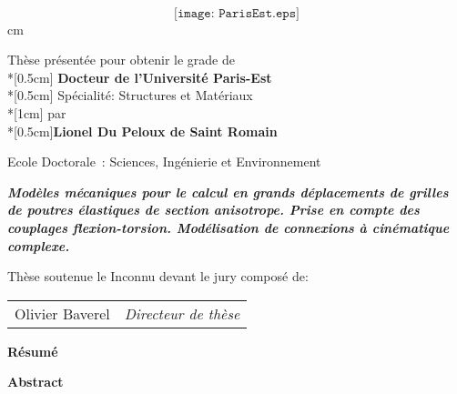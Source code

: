 \documentclass[12pt,a4paper]{book}
\begin{document}
\begin{titlepage}

\ \vspace{-2cm} { \[ \texttt{[image: ParisEst.eps]}\]}
 cm
\begin{center}
\large Thèse présentée pour obtenir le grade de\\*[0.5cm]
  {\bf \Large Docteur de l'Université Paris-Est}\\*[0.5cm]
  Spécialité: Structures et Matériaux\\*[1cm]
  par\\*[0.5cm]{\bf \Large Lionel Du Peloux de Saint Romain}\\
\end{center}\begin{center}
\begin{minipage}{15cm}
\begin{center}
Ecole Doctorale~:  \sc Sciences,  Ingénierie et Environnement
\end{center}
\end{minipage}
\end{center}
\vfill
\begin{center}
\begin{minipage}{15cm}
\begin{center}
  \LARGE \bf\em Modèles mécaniques pour le calcul en grands déplacements de grilles de poutres élastiques de section anisotrope. Prise en compte des couplages flexion-torsion. Modélisation de connexions à cinématique complexe.
\end{center}
\end{minipage}
\end{center}
\vfill
Thèse soutenue le Inconnu devant le jury composé de:\\
\vspace{0.2cm}
\begin{center}
\begin{tabular}{ll}
Olivier Baverel & \em Directeur de thèse\\
\end{tabular}
\end{center}
\end{titlepage}
\newpage
\begin{center}
   {\Large\bf Résumé}
\end{center}
\begin{quote}\small

\end{quote}
\vfill
\begin{center}
   {\Large\bf Abstract}
\end{center}
\begin{quote}\small

\end{quote}
\vfill
\cleardoublepage
\end{document}
